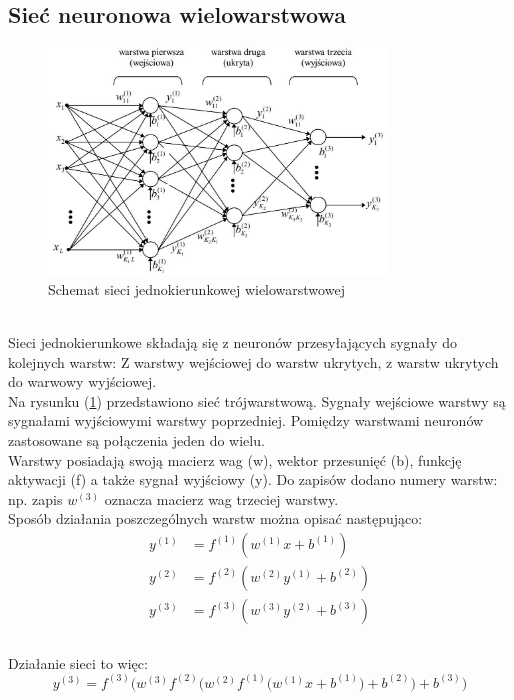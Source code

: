 \documentclass[a4paper, openright, twoside,11pt]{article}
\begin{document}
    \subsection{Sieć neuronowa wielowarstwowa}
        \begin{figure}[h]
        \centering
        \includegraphics[width=0.8\textwidth]{Grafika/schemat_sieci.jpg}
        \caption{Schemat sieci jednokierunkowej wielowarstwowej}
        \label{fig:SchematSieci}
    \end{figure}\\
    Sieci jednokierunkowe składają się z neuronów przesyłających sygnały do kolejnych warstw:
    Z warstwy wejściowej do warstw ukrytych, z warstw ukrytych do warwowy wyjściowej.\\
    Na rysunku (\ref{fig:SchematSieci}) przedstawiono sieć trójwarstwową. Sygnały wejściowe warstwy są sygnałami wyjściowymi warstwy poprzedniej. Pomiędzy warstwami neuronów zastosowane są połączenia jeden do wielu. \\
    Warstwy posiadają swoją macierz wag (w), wektor przesunięć (b), funkcję aktywacji (f) a także sygnał wyjściowy (y). Do zapisów dodano numery warstw: np. zapis $w^{(3)} $ oznacza macierz wag trzeciej warstwy.\\
    Sposób działania poszczególnych warstw można opisać następująco:
     \begin{equation}
        \begin{aligned}
        y^{(1)} &= f^{(1)}(w^{(1)}x+b^{(1)})\\
        y^{(2)} &= f^{(2)}(w^{(2)}y^{(1)}+b^{(2)})\\
        y^{(3)} &= f^{(3)}(w^{(3)}y^{(2)}+b^{(3)})\\
        \end{aligned}    
    \end{equation}\\[0.3cm]
    Działanie sieci to więc:
    \begin{equation}
    y^{(3)} = f^{(3)}\Bigg(w^{(3)}f^{(2)}\bigg(w^{(2)}f^{(1)}\Big(w^{(1)}x+b^{(1)}\Big)+b^{(2)}\bigg)+b^{(3)}\Bigg)
    \end{equation}
    
\end{document}
